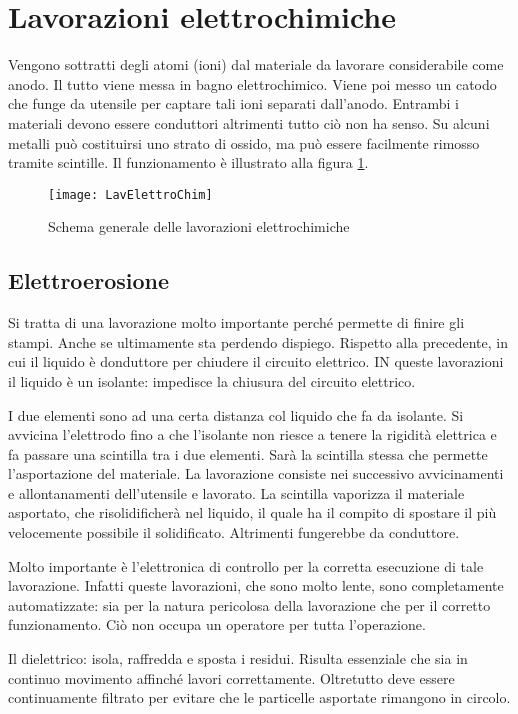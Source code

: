 \section{Lavorazioni elettrochimiche}
Vengono sottratti degli atomi (ioni) dal materiale da lavorare considerabile come anodo. Il tutto viene messa in bagno elettrochimico. Viene poi messo un catodo che funge da utensile per captare tali ioni separati dall'anodo.
Entrambi i materiali devono essere conduttori altrimenti tutto ciò non ha senso.
Su alcuni metalli può costituirsi uno strato di ossido, ma può essere facilmente rimosso tramite scintille.
Il funzionamento è illustrato alla figura \ref{fig:LavElettroChim}.

\begin{figure}
\centering
\texttt{[image: LavElettroChim]}
\caption{Schema generale delle lavorazioni elettrochimiche}
\label{fig:LavElettroChim}
\end{figure}

\subsection{Elettroerosione}
Si tratta di una lavorazione molto importante perché permette di finire gli stampi. Anche se ultimamente sta perdendo dispiego.
Rispetto alla precedente, in cui il liquido è donduttore per chiudere il circuito elettrico. IN queste lavorazioni il liquido è un isolante: impedisce la chiusura del circuito elettrico.

I due elementi sono ad una certa distanza col liquido che fa da isolante. Si avvicina l'elettrodo fino a che l'isolante non riesce a tenere la rigidità elettrica e fa passare una scintilla tra i due elementi.
Sarà la scintilla stessa che permette l'asportazione del materiale.
La lavorazione consiste nei successivo avvicinamenti e allontanamenti dell'utensile e lavorato.
La scintilla vaporizza il materiale asportato, che risolidificherà nel liquido, il quale ha il compito di spostare il più velocemente possibile il solidificato. Altrimenti fungerebbe da conduttore.

Molto importante è l'elettronica di controllo per la corretta esecuzione di tale lavorazione. Infatti queste lavorazioni, che sono molto lente, sono completamente automatizzate: sia per la natura pericolosa della lavorazione che per il corretto funzionamento. Ciò non occupa un operatore per tutta l'operazione.

Il dielettrico: isola, raffredda e sposta i residui. Risulta essenziale che sia in continuo movimento affinché lavori correttamente. Oltretutto deve essere continuamente filtrato per evitare che le particelle asportate rimangono in circolo. 

